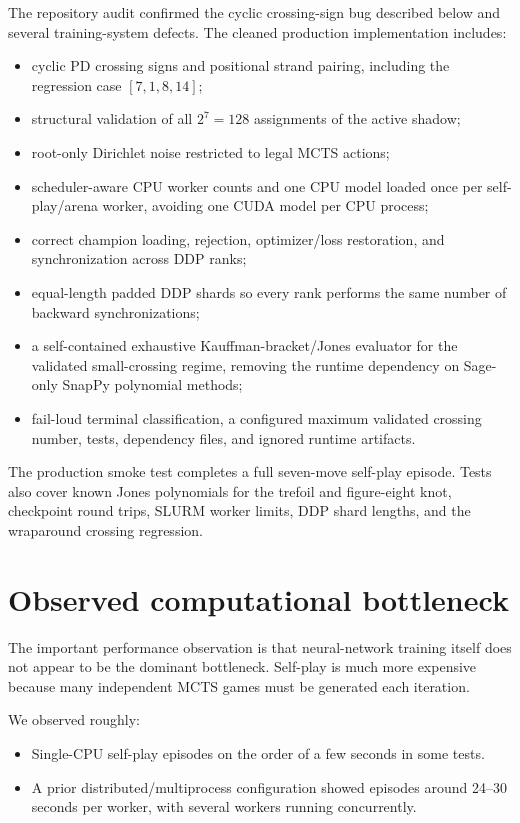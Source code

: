 \documentclass[11pt]{article}
\begin{document}
The repository audit confirmed the cyclic crossing-sign bug described below and several training-system defects. The cleaned production implementation includes:

\begin{itemize}
    \item cyclic PD crossing signs and positional strand pairing, including the regression case \([7,1,8,14]\);
    \item structural validation of all \(2^7=128\) assignments of the active shadow;
    \item root-only Dirichlet noise restricted to legal MCTS actions;
    \item scheduler-aware CPU worker counts and one CPU model loaded once per self-play/arena worker, avoiding one CUDA model per CPU process;
    \item correct champion loading, rejection, optimizer/loss restoration, and synchronization across DDP ranks;
    \item equal-length padded DDP shards so every rank performs the same number of backward synchronizations;
    \item a self-contained exhaustive Kauffman-bracket/Jones evaluator for the validated small-crossing regime, removing the runtime dependency on Sage-only SnapPy polynomial methods;
    \item fail-loud terminal classification, a configured maximum validated crossing number, tests, dependency files, and ignored runtime artifacts.
\end{itemize}

The production smoke test completes a full seven-move self-play episode. Tests also cover known Jones polynomials for the trefoil and figure-eight knot, checkpoint round trips, SLURM worker limits, DDP shard lengths, and the wraparound crossing regression.

\section{Observed computational bottleneck}

The important performance observation is that neural-network training itself does not appear to be the dominant bottleneck. Self-play is much more expensive because many independent MCTS games must be generated each iteration.

We observed roughly:

\begin{itemize}
    \item Single-CPU self-play episodes on the order of a few seconds in some tests.
    \item A prior distributed/multiprocess configuration showed episodes around 24--30 seconds per worker, with several workers running concurrently.
\end{itemize}
\end{document}
